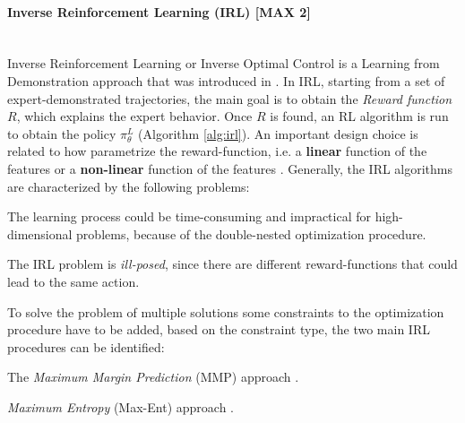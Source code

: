 \paragraph{Inverse Reinforcement Learning (IRL) [MAX 2]}  \mbox{} \\
Inverse Reinforcement Learning or Inverse Optimal Control is a Learning from Demonstration approach that was introduced in \cite{abbeel2004apprenticeship}. In IRL, starting from a set of expert-demonstrated trajectories, the main goal is to obtain the \textit{Reward function} $R$, which explains the expert behavior. Once $R$ is found, an RL algorithm is run to obtain the policy $\pi^{L}_{\theta}$ (Algorithm \ref{alg:irl}). %
An important design choice is related to how parametrize the reward-function, i.e. a \textbf{linear} function of the features \cite{ratliff2006maximum_margin,ziebart2008maximum_entropy} or  a \textbf{non-linear} function of the features \cite{ratliff2009learning_to_search,wulfmeier2015deep_inverse_rl,finn2016guided_cost_learning}.
Generally, the IRL algorithms are characterized by the following problems: \begin{enumerate*}[label=\textbf{(\arabic*)}]
    \item The learning process could be time-consuming and impractical for high-dimensional problems, because of the double-nested optimization procedure.  
    \item The IRL problem is \textit{ill-posed}, since there are different reward-functions that could lead to the same action.
\end{enumerate*}
%
\newline To solve the problem of multiple solutions some constraints to the optimization procedure have to be added, based on the constraint type, the two main IRL procedures can be identified: \begin{enumerate*}[label=\textbf{(\alph*)}]
    \item The \textit{Maximum Margin Prediction} (MMP) approach \cite{ratliff2006maximum_margin,ratliff2009learning_to_search}.  
    \item \textit{Maximum Entropy} (Max-Ent) approach \cite{ziebart2008maximum_entropy,wulfmeier2015deep_inverse_rl,finn2016guided_cost_learning}.
\end{enumerate*}

